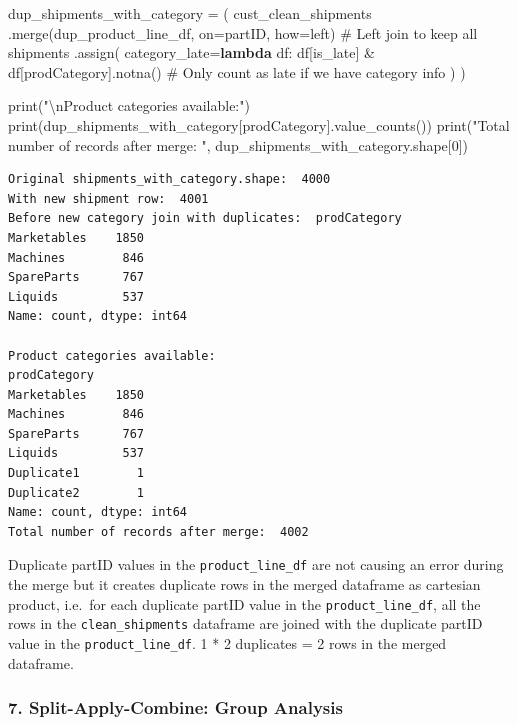 \documentclass[
]{article}
\newenvironment{Shaded}{\begin{snugshade}}{\end{snugshade}}
\newcommand{\BuiltInTok}[1]{\textcolor[rgb]{0.00,0.23,0.31}{#1}}
\newcommand{\CharTok}[1]{\textcolor[rgb]{0.13,0.47,0.30}{#1}}
\newcommand{\CommentTok}[1]{\textcolor[rgb]{0.37,0.37,0.37}{#1}}
\newcommand{\DecValTok}[1]{\textcolor[rgb]{0.68,0.00,0.00}{#1}}
\newcommand{\KeywordTok}[1]{\textcolor[rgb]{0.00,0.23,0.31}{\textbf{#1}}}
\newcommand{\NormalTok}[1]{\textcolor[rgb]{0.00,0.23,0.31}{#1}}
\newcommand{\OperatorTok}[1]{\textcolor[rgb]{0.37,0.37,0.37}{#1}}
\newcommand{\StringTok}[1]{\textcolor[rgb]{0.13,0.47,0.30}{#1}}
\begin{document}
\begin{Shaded}
\begin{Highlighting}[]
\NormalTok{dup\_shipments\_with\_category }\OperatorTok{=}\NormalTok{ (}
\NormalTok{    cust\_clean\_shipments}
\NormalTok{    .merge(dup\_product\_line\_df, on}\OperatorTok{=}\StringTok{\textquotesingle{}partID\textquotesingle{}}\NormalTok{, how}\OperatorTok{=}\StringTok{\textquotesingle{}left\textquotesingle{}}\NormalTok{)  }\CommentTok{\# Left join to keep all shipments}
\NormalTok{    .assign(}
\NormalTok{        category\_late}\OperatorTok{=}\KeywordTok{lambda}\NormalTok{ df: df[}\StringTok{\textquotesingle{}is\_late\textquotesingle{}}\NormalTok{] }\OperatorTok{\&}\NormalTok{ df[}\StringTok{\textquotesingle{}prodCategory\textquotesingle{}}\NormalTok{].notna()  }\CommentTok{\# Only count as late if we have category info}
\NormalTok{    )}
\NormalTok{)}

\BuiltInTok{print}\NormalTok{(}\StringTok{"}\CharTok{\textbackslash{}n}\StringTok{Product categories available:"}\NormalTok{)}
\BuiltInTok{print}\NormalTok{(dup\_shipments\_with\_category[}\StringTok{\textquotesingle{}prodCategory\textquotesingle{}}\NormalTok{].value\_counts())}
\BuiltInTok{print}\NormalTok{(}\StringTok{"Total number of records after merge: "}\NormalTok{, dup\_shipments\_with\_category.shape[}\DecValTok{0}\NormalTok{])}
\end{Highlighting}
\end{Shaded}

\begin{verbatim}
Original shipments_with_category.shape:  4000
With new shipment row:  4001
Before new category join with duplicates:  prodCategory
Marketables    1850
Machines        846
SpareParts      767
Liquids         537
Name: count, dtype: int64

Product categories available:
prodCategory
Marketables    1850
Machines        846
SpareParts      767
Liquids         537
Duplicate1        1
Duplicate2        1
Name: count, dtype: int64
Total number of records after merge:  4002
\end{verbatim}

Duplicate partID values in the \texttt{product\_line\_df} are not
causing an error during the merge but it creates duplicate rows in the
merged dataframe as cartesian product, i.e.~for each duplicate partID
value in the \texttt{product\_line\_df}, all the rows in the
\texttt{clean\_shipments} dataframe are joined with the duplicate partID
value in the \texttt{product\_line\_df}. 1 * 2 duplicates = 2 rows in
the merged dataframe.

\subsubsection{7. Split-Apply-Combine: Group
Analysis}\label{split-apply-combine-group-analysis}
\end{document}
